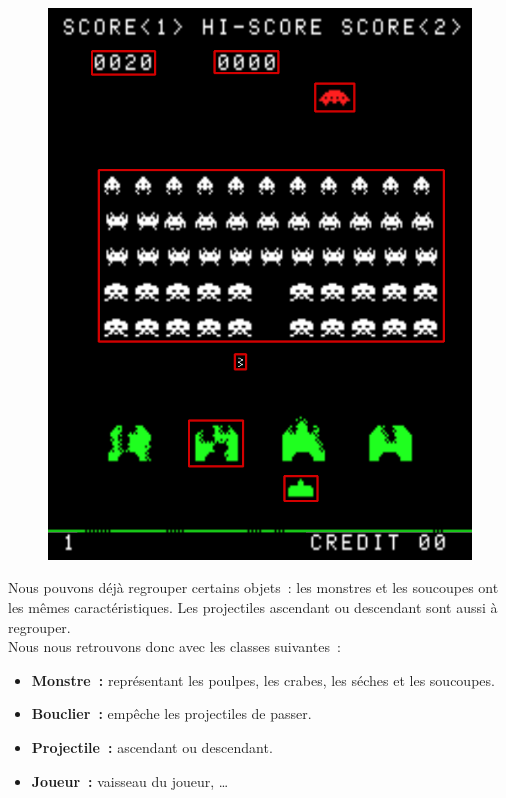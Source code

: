 \begin{figure}[!h]
  \begin{center}
    \includegraphics[scale=0.462]{images/space_game12.png}
  \end{center}
\end{figure}

Nous pouvons déjà regrouper certains objets~: les monstres et les soucoupes ont les mêmes caractéristiques. Les projectiles ascendant ou descendant sont aussi à regrouper.\\

Nous nous retrouvons donc avec les classes suivantes~:
\begin{itemize}
   \item \textbf{Monstre~:} représentant les poulpes, les crabes, les séches et les soucoupes.
   \item \textbf{Bouclier~:} empêche les projectiles de passer.
   \item \textbf{Projectile~:} ascendant ou descendant.
   \item \textbf{Joueur~:} vaisseau du joueur, \ldots
\end{itemize}

